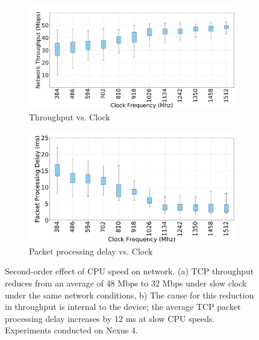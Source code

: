 \begin{figure}
    \begin{subfigure}[b]{0.33\textwidth}
        \centering
        \includegraphics[width=1\linewidth]{sections/device-work/Throughput}
        \caption{Throughput vs. Clock}
    \end{subfigure}
    \begin{subfigure}[b]{0.33\textwidth}
        \centering
        \includegraphics[width=1\linewidth]{sections/device-work/ppd}
        \caption{Packet processing delay vs. Clock}
    \end{subfigure}%
     \caption{Second-order effect of CPU speed on network. (a) TCP throughput reduces from an average of 48 Mbps to 32 Mbps under slow clock under the same network conditions, b) The cause for this reduction in throughput is internal to the device; the average TCP packet processing delay increases by 12 ms at slow CPU speeds. Experiments conducted on Nexus 4.}
     \label{fig:tcp-perf}
     \vspace*{-1em}
\end{figure}


